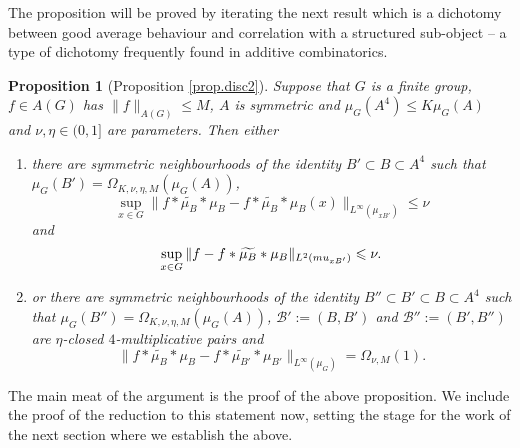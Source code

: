 \documentclass[12pt]{amsart}
\numberwithin{equation}{section}
\theoremstyle{plain}
\newtheorem{proposition}[subsection]{Proposition}
\theoremstyle{definition}
\renewcommand{\leq}{\leqslant}
\begin{document}
The proposition will be proved by iterating the next result which is a dichotomy between good average behaviour and correlation with a structured sub-object -- a type of dichotomy frequently found in additive combinatorics.
\begin{proposition}[{Proposition \ref{prop.disc2}}]\label{prop.disclarge}
Suppose that $G$ is a finite group, $f \in A(G)$ has $\|f\|_{A(G)} \leq M$, $A$ is symmetric and $\mu_G(A^4) \leq K\mu_G(A)$ and $\nu,\eta \in (0,1]$ are parameters.  Then either
\begin{enumerate}
\item there are symmetric neighbourhoods of the identity $B' \subset B \subset A^4$ such that $\mu_G(B')=\Omega_{K,\nu,\eta,M}(\mu_G(A))$,
\begin{equation*}
\sup_{x \in G}{\|f\ast\widetilde{\mu_B}\ast  \mu_B-f\ast\widetilde{\mu_B}\ast  \mu_B(x)\|_{L^\infty(\mu_{xB'})}}\leq \nu
\end{equation*}
and
\begin{equation*}
\sup_{x \in G}{\|f - f\ast\widetilde{\mu_B}\ast  \mu_B\|_{L^2(\\mu_{xB'})}}\leq \nu.
\end{equation*}
\item or there are symmetric neighbourhoods of the identity $B''\subset B' \subset B \subset A^4$ such that  $\mu_G(B'')=\Omega_{K,\nu,\eta,M}(\mu_G(A))$, $\mathcal{B}':=(B,B')$ and $\mathcal{B}'':=(B',B'')$ are $\eta$-closed $4$-multiplicative pairs and
\begin{equation*}
\|f \ast \widetilde{\mu_B}\ast  \mu_B - f \ast \widetilde{\mu_{B'}}\ast  \mu_{B'}\|_{L^\infty(\mu_G)}= \Omega_{\nu,M}(1).
\end{equation*}
\begin{equation*}
\end{equation*}
\end{enumerate}
\end{proposition}
The main meat of the argument is the proof of the above proposition.  We include the proof of the reduction to this statement now, setting the stage for the work of the next section where we establish the above.
\end{document}
